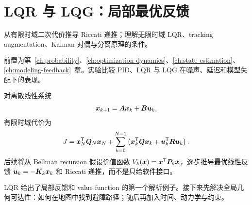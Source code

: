 \chapter{LQR 与 LQG：局部最优反馈}
\label{ch:lqr}

\begin{learningobjectives}
从有限时域二次代价推导 Riccati 递推；理解无限时域 LQR、tracking augmentation、Kalman 对偶与分离原理的条件。
\end{learningobjectives}

\begin{prerequisites}
前置为第~\ref{ch:probability}、\ref{ch:optimization-dynamics}、\ref{ch:state-estimation}、\ref{ch:modeling-feedback}~章。实验比较 PID、LQR 与 LQG 在噪声、延迟和模型失配下的表现。
\end{prerequisites}

对离散线性系统
\begin{equation}
  \bm{x}_{k+1}=\bm{A}\bm{x}_k+\bm{B}\bm{u}_k,
\end{equation}
有限时域代价为
\begin{equation}
  J=\bm{x}_N^{\mathsf T}\bm{Q}_N\bm{x}_N+
  \sum_{k=0}^{N-1}
  \left(\bm{x}_k^{\mathsf T}\bm{Q}\bm{x}_k+
  \bm{u}_k^{\mathsf T}\bm{R}\bm{u}_k\right).
\end{equation}
后续将从 Bellman recursion 假设价值函数 $V_k(\bm{x})=\bm{x}^{\mathsf T}\bm{P}_k\bm{x}$，逐步推导最优线性反馈 $\bm{u}_k=-\bm{K}_k\bm{x}_k$ 和 Riccati 递推，而不是只给软件接口。


\begin{chaptertransition}
LQR 给出了局部反馈和 value function 的第一个解析例子。接下来先解决全局几何可达性：如何在地图中找到避障路径；随后再加入时间、动力学与约束。
\end{chaptertransition}

